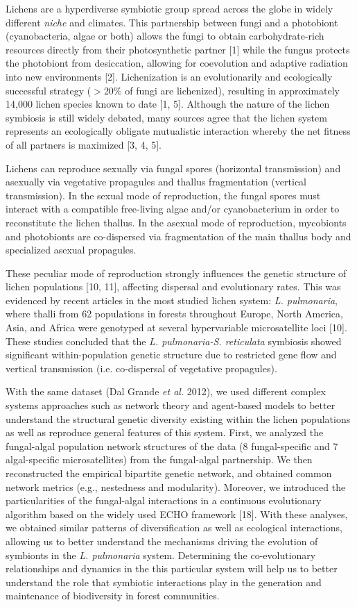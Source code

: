 Lichens are a hyperdiverse symbiotic group spread across the globe in widely different {\em niche} and climates. This partnership between fungi and a photobiont (cyanobacteria, algae or both) allows the fungi to obtain carbohydrate-rich resources directly from their photosynthetic partner [1] while the fungus protects the photobiont from desiccation, allowing for coevolution and adaptive radiation into new environments [2]. Lichenization is an evolutionarily and ecologically successful strategy ($>$20\% of fungi are lichenized), resulting in approximately 14,000 lichen species known to date [1, 5]. Although the nature of the lichen symbiosis is still widely debated, many sources agree that the lichen system represents an ecologically obligate mutualistic interaction whereby the net fitness of all partners is maximized [3, 4, 5].

Lichens can reproduce sexually via fungal spores (horizontal transmission) and asexually via vegetative propagules and thallus fragmentation (vertical transmission). In the sexual mode of reproduction, the fungal spores must interact with a compatible free-living algae and/or cyanobacterium in order to reconstitute the lichen thallus. In the asexual mode of reproduction, mycobionts and photobionts are co-dispersed via fragmentation of the main thallus body and specialized asexual propagules.

These peculiar mode of reproduction strongly influences the genetic structure of lichen populations [10, 11], affecting dispersal and evolutionary rates. This was evidenced by recent articles in the most studied lichen system: {\em L. pulmonaria}, where thalli from 62 populations in forests throughout Europe, North America, Asia, and Africa were genotyped at several hypervariable microsatellite loci [10]. These studies concluded that the {\em L. pulmonaria-S. reticulata} symbiosis showed significant within-population genetic structure due to restricted gene flow and vertical transmission (i.e. co-dispersal of vegetative propagules). 

With the same dataset (Dal Grande {\em et al.} 2012), we used different complex systems approaches such as network theory and agent-based models to better understand the structural genetic diversity existing within the lichen populations as well as reproduce general features of this system. First, we analyzed the fungal-algal population network structures of the data (8 fungal-specific and 7 algal-specific microsatellites) from the fungal-algal partnership. We then reconstructed the empirical bipartite genetic network, and obtained common network metrics (e.g., nestedness and modularity). Moreover, we introduced the particularities of the fungal-algal interactions in a continuous evolutionary algorithm based on the widely used ECHO framework [18]. With these analyses, we obtained similar patterns of diversification as well as ecological interactions, allowing us to better understand the mechanisms driving the evolution of symbionts in the {\em L. pulmonaria} system. Determining the co-evolutionary relationships and dynamics in the this particular system will help us to better understand the role that symbiotic interactions play in the generation and maintenance of biodiversity in forest communities.


